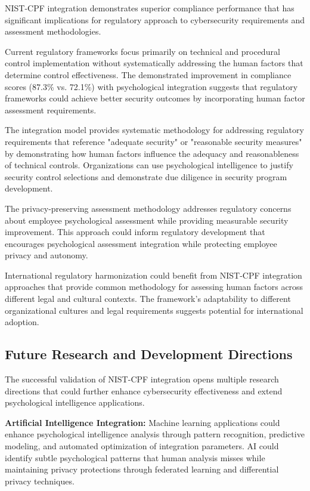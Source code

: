 \documentclass[10pt, twocolumn]{article}
\begin{document}
NIST-CPF integration demonstrates superior compliance performance that has significant implications for regulatory approach to cybersecurity requirements and assessment methodologies.

Current regulatory frameworks focus primarily on technical and procedural control implementation without systematically addressing the human factors that determine control effectiveness. The demonstrated improvement in compliance scores (87.3\% vs. 72.1\%) with psychological integration suggests that regulatory frameworks could achieve better security outcomes by incorporating human factor assessment requirements.

The integration model provides systematic methodology for addressing regulatory requirements that reference "adequate security" or "reasonable security measures" by demonstrating how human factors influence the adequacy and reasonableness of technical controls. Organizations can use psychological intelligence to justify security control selections and demonstrate due diligence in security program development.

The privacy-preserving assessment methodology addresses regulatory concerns about employee psychological assessment while providing measurable security improvement. This approach could inform regulatory development that encourages psychological assessment integration while protecting employee privacy and autonomy.

International regulatory harmonization could benefit from NIST-CPF integration approaches that provide common methodology for assessing human factors across different legal and cultural contexts. The framework's adaptability to different organizational cultures and legal requirements suggests potential for international adoption.

\subsection{Future Research and Development Directions}

The successful validation of NIST-CPF integration opens multiple research directions that could further enhance cybersecurity effectiveness and extend psychological intelligence applications.

\textbf{Artificial Intelligence Integration:} Machine learning applications could enhance psychological intelligence analysis through pattern recognition, predictive modeling, and automated optimization of integration parameters. AI could identify subtle psychological patterns that human analysis misses while maintaining privacy protections through federated learning and differential privacy techniques.
\end{document}
